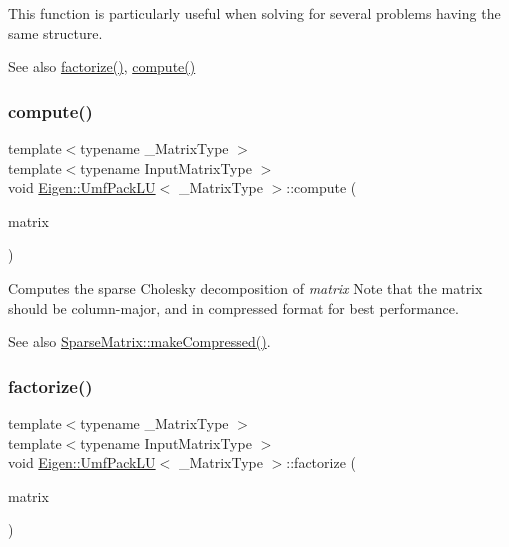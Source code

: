This function is particularly useful when solving for several problems having the same structure.

\begin{DoxySeeAlso}{See also}
\mbox{\hyperlink{class_eigen_1_1_umf_pack_l_u_a1471bf890503e743c45d75cc02a5345d}{factorize()}}, \mbox{\hyperlink{class_eigen_1_1_umf_pack_l_u_a05fb2b5717ebd67e46b83439721ceee7}{compute()}} 
\end{DoxySeeAlso}
\mbox{\label{class_eigen_1_1_umf_pack_l_u_a05fb2b5717ebd67e46b83439721ceee7}} 
\subsubsection{\texorpdfstring{compute()}{compute()}}
{\footnotesize\ttfamily template$<$typename \+\_\+\+Matrix\+Type $>$ \\
template$<$typename Input\+Matrix\+Type $>$ \\
void \mbox{\hyperlink{class_eigen_1_1_umf_pack_l_u}{Eigen\+::\+Umf\+Pack\+LU}}$<$ \+\_\+\+Matrix\+Type $>$\+::compute (\begin{DoxyParamCaption}\item[{const Input\+Matrix\+Type \&}]{matrix }\end{DoxyParamCaption})\hspace{0.3cm}{\ttfamily [inline]}}

Computes the sparse Cholesky decomposition of {\itshape matrix} Note that the matrix should be column-\/major, and in compressed format for best performance. \begin{DoxySeeAlso}{See also}
\mbox{\hyperlink{class_eigen_1_1_sparse_matrix_a5ff54ffc10296f9466dc81fa888733fd}{Sparse\+Matrix\+::make\+Compressed()}}. 
\end{DoxySeeAlso}
\mbox{\label{class_eigen_1_1_umf_pack_l_u_a1471bf890503e743c45d75cc02a5345d}} 
\subsubsection{\texorpdfstring{factorize()}{factorize()}}
{\footnotesize\ttfamily template$<$typename \+\_\+\+Matrix\+Type $>$ \\
template$<$typename Input\+Matrix\+Type $>$ \\
void \mbox{\hyperlink{class_eigen_1_1_umf_pack_l_u}{Eigen\+::\+Umf\+Pack\+LU}}$<$ \+\_\+\+Matrix\+Type $>$\+::factorize (\begin{DoxyParamCaption}\item[{const Input\+Matrix\+Type \&}]{matrix }\end{DoxyParamCaption})\hspace{0.3cm}{\ttfamily [inline]}}

